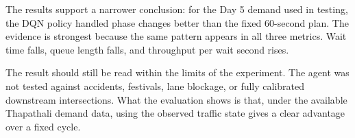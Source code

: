 The results support a narrower conclusion: for the Day 5 demand used in
testing, the DQN policy handled phase changes better than the fixed
60-second plan. The evidence is strongest because the same pattern
appears in all three metrics. Wait time falls, queue length falls, and
throughput per wait second rises.

The result should still be read within the limits of the experiment. The
agent was not tested against accidents, festivals, lane blockage, or
fully calibrated downstream intersections. What the evaluation shows is
that, under the available Thapathali demand data, using the observed
traffic state gives a clear advantage over a fixed cycle.
